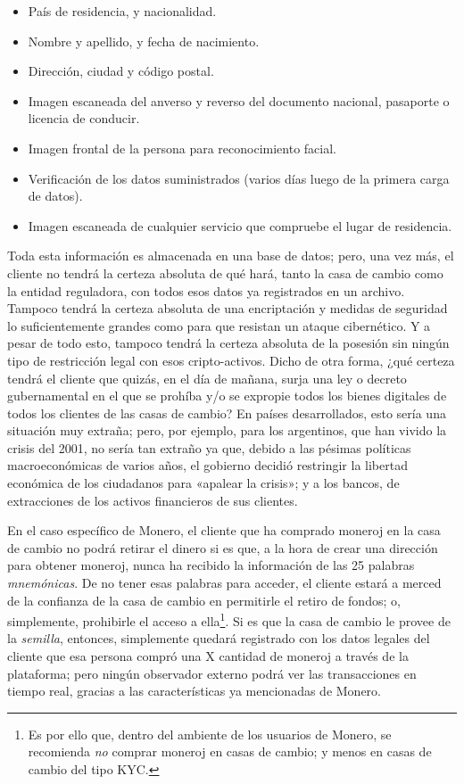 \documentclass[12pt,a4paper,twoside]{book}
\begin{document}
\begin{itemize}
\item País de residencia, y nacionalidad.
\item Nombre y apellido, y fecha de nacimiento.
\item Dirección, ciudad y código postal.
\item Imagen escaneada del anverso y reverso del documento nacional, pasaporte o licencia de conducir.
\item Imagen frontal de la persona para reconocimiento facial.
\item Verificación de los datos suministrados (varios días luego de la primera carga de datos).
\item Imagen escaneada de cualquier servicio que compruebe el lugar de residencia.
\end{itemize}

Toda esta información es almacenada en una base de datos; pero, una vez más, el cliente no tendrá la certeza absoluta de qué hará, tanto la casa de cambio como la entidad reguladora, con todos esos datos ya registrados en un archivo. Tampoco tendrá la certeza absoluta de una encriptación y medidas de seguridad lo suficientemente grandes como para que resistan un ataque cibernético. Y a pesar de todo esto, tampoco tendrá la certeza absoluta de la posesión sin ningún tipo de restricción legal con esos cripto-activos. Dicho de otra forma, ¿qué certeza tendrá el cliente que quizás, en el día de mañana, surja una ley o decreto gubernamental en el que se prohíba y/o se expropie todos los bienes digitales de todos los clientes de las casas de cambio? En países desarrollados, esto sería una situación muy extraña; pero, por ejemplo, para los argentinos, que han vivido la crisis del 2001, no sería tan extraño ya que, debido a las pésimas políticas macroeconómicas de varios años, el gobierno decidió restringir la libertad económica de los ciudadanos para «apalear la crisis»; y a los bancos, de extracciones de los activos financieros de sus clientes.

En el caso específico de Monero, el cliente que ha comprado moneroj en la casa de cambio no podrá retirar el dinero si es que, a la hora de crear una dirección para obtener moneroj, nunca ha recibido la información de las 25 palabras \textit{mnemónicas}. De no tener esas palabras para acceder, el cliente estará a merced de la confianza de la casa de cambio en permitirle el retiro de fondos; o, simplemente, prohibirle el acceso a ella\footnote{Es por ello que, dentro del ambiente de los usuarios de Monero, se recomienda \textit{no} comprar moneroj en casas de cambio; y menos en casas de cambio del tipo KYC.}. Si es que la casa de cambio le provee de la \textit{semilla}, entonces, simplemente quedará registrado con los datos legales del cliente que esa persona compró una X cantidad de moneroj a través de la plataforma; pero ningún observador externo podrá ver las transacciones en tiempo real, gracias a las características ya mencionadas de Monero.
\end{document}

